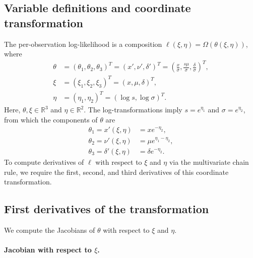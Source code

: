 \documentclass{article}
\begin{document}
\subsection{Variable definitions and coordinate transformation}

The per-observation log-likelihood is a composition $\ell(\xi, \eta) = \Omega(\theta(\xi, \eta))$, where
%
\begin{align}
  \theta & = (\theta_1, \theta_2, \theta_3)^T = (x', \nu', \delta')^T = \left(\frac{x}{\sigma}, \frac{s \mu}{\sigma}, \frac{\delta}{\sigma}\right)^T, \\
  \xi    & = (\xi_1, \xi_2, \xi_3)^T = (x, \mu, \delta)^T,                                                                                            \\
  \eta   & = (\eta_1, \eta_2)^T = (\log s, \log \sigma)^T.
\end{align}
%
Here, $\theta, \xi \in \mathbb{R}^3$ and $\eta \in \mathbb{R}^2$.
%
The log-transformations imply $s = e^{\eta_1}$ and $\sigma = e^{\eta_2}$, from which the components of $\theta$ are
%
\begin{align}
  \theta_1 = x'(\xi, \eta)      & = x e^{-\eta_2},           \\
  \theta_2 = \nu'(\xi, \eta)    & = \mu e^{\eta_1 - \eta_2}, \\
  \theta_3 = \delta'(\xi, \eta) & = \delta e^{-\eta_2}.
\end{align}
%
To compute derivatives of $\ell$ with respect to $\xi$ and $\eta$ via the multivariate chain rule, we require the first, second, and third derivatives of this coordinate transformation.

\subsection{First derivatives of the transformation}\label{app:first-derivatives-of-transformation}

We compute the Jacobians of $\theta$ with respect to $\xi$ and $\eta$.

\paragraph{Jacobian with respect to $\xi$.}
\end{document}
